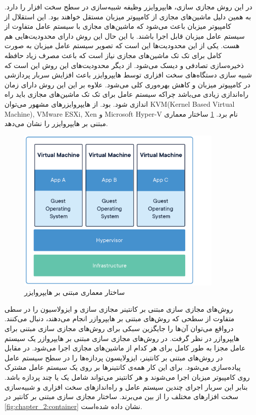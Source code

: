       در این روش مجازی سازی، {هایپروایزر} وظیفه شبیه‌سازی در سطح سخت افزار را دارد.
      به همین دلیل ماشین‌های مجازی از کامپیوتر میزبان مستقل خواهند بود.
      این استقلال از کامپیوتر میزبان باعث می‌شود که ماشین‌های مجازی با سیستم عامل متفاوت از سیستم عامل میزبان قابل اجرا باشند\cite{morabito2015hypervisors}.
      با این حال این روش دارای محدودیت‌هایی هم هست.
      یکی از این محدودیت‌ها این است که تصویر سیستم عامل میزبان به صورت کامل برای تک تک ماشین‌های مجازی نیاز است که باعث مصرف زیاد حافظه ذخیره‌سازی تصادفی و دیسک می‌شود.
      از دیگر محدودیت‌های این روش این است که شبیه سازی دستگاه‌های سخت افزاری توسط {هایپروایزر}  باعث افزایش سربار پردازشی در کامپیوتر میزبان و کاهش بهره‌وری کلی می‌شود.
      علاوه بر این این روش دارای زمان راه‌اندازی زیادی می‌باشد چراکه سیستم عامل برای تک تک ماشین‌های مجازی باید راه اندازی شود.
      بود.
      از {هایپروایزر}های مشهور می‌توان KVM(Kernel Based Virtual Machine), VMware ESXi, Xen و Microsoft Hyper-V نام برد.
      \cref{fig:chapter_2:vm} ساختار معماری مبتنی بر {هایپروایزر} را نشان می‌دهد.

      \begin{figure}[]
        \centerline{\includegraphics[width=10cm]{graphics/chapter_2/vm}}
        \caption{ساختار معماری مبتنی بر {هایپروایزر} \cite{2018are}}
        \label{fig:chapter_2:vm}
      \end{figure}

      روش‌های مجازی سازی مبتنی بر کانتینر مجازی سازی و ایزولاسیون را در سطی متفاوت از سطحی که روش‌های مبتنی بر {هایپروازر} انجام می‌دهند، دنبال می‌کنند.
      درواقع می‌توان آن‌ها را جایگزین سبکی برای روش‌های مجازی سازی مبتنی برای {هایپروازر} در نظر گرفت.
      در روش‌های مجازی سازی مبتنی بر {هایپروازر} یک سیستم عامل مجزا به طور کامل برای هر کدام از ماشین‌های مجازی اجرا می‌شود.
      در مقابل در روش‌های مبتنی بر کانتینر، ایزولایسون پردازه‌ها را در سطح سیستم عامل پیاده‌سازی می‌شود.
      برای این کار همه‌ی کانتینر‌ها بر روی یک سیستم عامل مشترک روی کامپیوتر میزبان اجرا می‌شوند و هر کانتینر می‌تواند شامل یک یا چند پردازه باشد.
      بنابر این سربار اجرای چندین سیستم عامل و راه‌انداز‌های سخت افزاری و شبیه‌سازی سخت افزار‌های مختلف را از بین می‌برند.
      ساختار مجازی سازی مبتنی بر کانتیر در \cref{fig:chapter_2:container} نشان داده شده‌است.
            

